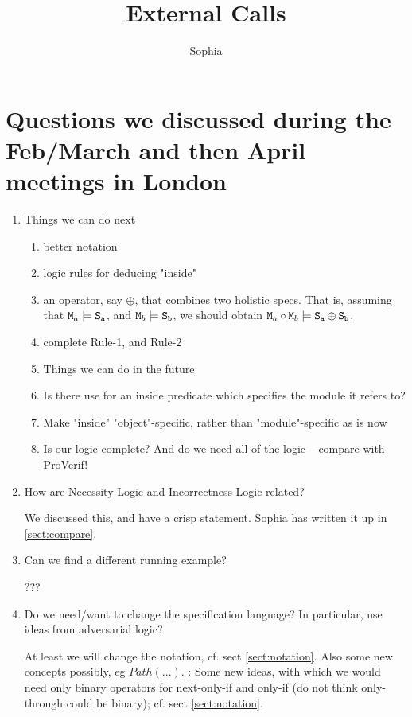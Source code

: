 \documentclass[11pt]{article} %
\title{External Calls}
\author{Sophia}
\theoremstyle{definition}
\begin{document}
\maketitle

\section{Questions we discussed during   the Feb/March and then April meetings in London}

\begin{enumerate}
\item
Things we can do next
\begin{enumerate}
\item
better notation
\item
logic rules for deducing "inside"

\item
an operator, say  $\oplus$,  that combines two holistic specs. That is, assuming that
${\texttt{M}}{_a} \models {\texttt{S}}_{{\texttt{a}}}$, and ${\texttt{M}}{_b} \models {\texttt{S}}_{{\texttt{b}}}$, we should obtain
${\texttt{M}}{_a}\circ {\texttt{M}}{_b} \models  {\texttt{S}}_{{\texttt{a}}} \oplus {\texttt{S}}_{{\texttt{b}}}$.

\item
complete Rule-1, and Rule-2

\item
Things we can do in the future
\item 
Is there use for an inside predicate which specifies the module it refers to?

\item
Make "inside" "object"-specific, rather than "module"-specific as is now

\item
Is our logic complete? And do we need all of the logic -- compare with ProVerif!
\end{enumerate}

 

\item
How are Necessity Logic and Incorrectness Logic related?

We discussed this, and have a crisp statement. Sophia has written it up in \ref{sect:compare}.

\item
Can we find a different running example?

??? 
\item
Do we need/want to change  the specification language? In particular, use ideas from adversarial logic?

At least we will change the notation, cf. sect \ref{sect:notation}. Also some new concepts possibly, eg $Path(...)$.
\SP: Some new ideas, with which we would   need only binary operators for next-only-if and only-if (do not think only-through could be binary); cf. sect \ref{sect:notation}. 


\end{enumerate}
\end{document}
